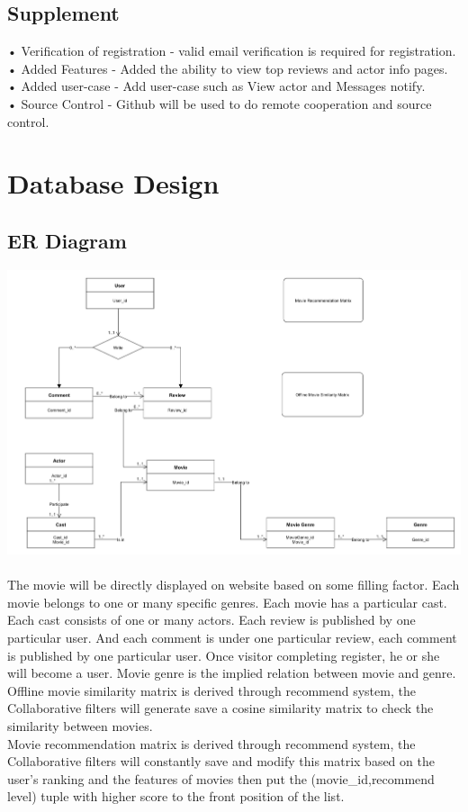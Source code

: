 \documentclass[12pt]{article}
\begin{document}
\subsection{Supplement}
• Verification of registration - valid email verification is required for registration.\\
• Added Features - Added the ability to view top reviews and actor info pages.\\
• Added user-case - Add user-case such as View actor and Messages notify.\\
• Source Control - Github will be used to do remote cooperation and source control.\\


\section{Database Design}
\subsection{ER Diagram}
\includegraphics[width=1\linewidth]{ER.jpg}\\
\\The movie will be directly displayed on website based on some filling factor. Each movie belongs to one or many specific genres. Each movie has a particular cast. Each cast consists of one or many actors. Each review is published by one particular user. And each comment is under one particular review, each comment is published by one particular user. Once visitor completing register, he or she will become a user. Movie genre is the implied relation between movie and genre.\\
Offline movie similarity matrix is derived through recommend system, the Collaborative filters will generate save a cosine similarity matrix to check the similarity between movies.\\
Movie recommendation matrix is derived through recommend system, the Collaborative filters will constantly save and modify this matrix based on the user's ranking and the features of movies then put the (movie\_id,recommend level) tuple with higher score to the front position of the list.\\
\newpage
\end{document}
